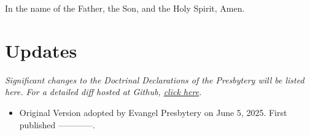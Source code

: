 \documentclass[
]{book}
\providecommand{\tightlist}{%
  \setlength{\itemsep}{0pt}\setlength{\parskip}{0pt}}
\begin{document}
In the name of the Father, the Son, and the Holy Spirit, Amen.

\hypertarget{updates}{%
\chapter*{Updates}\label{updates}}

\emph{Significant changes to the Doctrinal Declarations of the Presbytery will be listed here. For a detailed diff hosted at Github, \href{https://github.com/Evangel-Presbytery/evangel-ddp}{click here}.}

\begin{itemize}
\tightlist
\item
  Original Version adopted by Evangel Presbytery on June 5, 2025. First published ------------.
\end{itemize}
\end{document}
